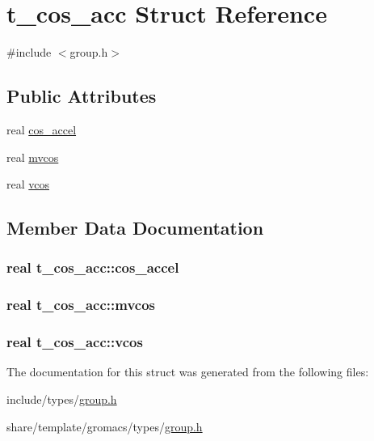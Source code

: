 \hypertarget{structt__cos__acc}{\section{t\-\_\-cos\-\_\-acc \-Struct \-Reference}
\label{structt__cos__acc}
}


{\ttfamily \#include $<$group.\-h$>$}

\subsection*{\-Public \-Attributes}
\begin{DoxyCompactItemize}
\item 
real \hyperlink{structt__cos__acc_aa9fc7e4b40d13e6993f7da90b6ddd2db}{cos\-\_\-accel}
\item 
real \hyperlink{structt__cos__acc_a46628a74f348199f4898c2e503c36602}{mvcos}
\item 
real \hyperlink{structt__cos__acc_a4e7dfb166a61e8dac5c9a698602eef5a}{vcos}
\end{DoxyCompactItemize}


\subsection{\-Member \-Data \-Documentation}
\hypertarget{structt__cos__acc_aa9fc7e4b40d13e6993f7da90b6ddd2db}{
\subsubsection[{cos\-\_\-accel}]{\setlength{\rightskip}{0pt plus 5cm}real {\bf t\-\_\-cos\-\_\-acc\-::cos\-\_\-accel}}}\label{structt__cos__acc_aa9fc7e4b40d13e6993f7da90b6ddd2db}
\hypertarget{structt__cos__acc_a46628a74f348199f4898c2e503c36602}{
\subsubsection[{mvcos}]{\setlength{\rightskip}{0pt plus 5cm}real {\bf t\-\_\-cos\-\_\-acc\-::mvcos}}}\label{structt__cos__acc_a46628a74f348199f4898c2e503c36602}
\hypertarget{structt__cos__acc_a4e7dfb166a61e8dac5c9a698602eef5a}{
\subsubsection[{vcos}]{\setlength{\rightskip}{0pt plus 5cm}real {\bf t\-\_\-cos\-\_\-acc\-::vcos}}}\label{structt__cos__acc_a4e7dfb166a61e8dac5c9a698602eef5a}


\-The documentation for this struct was generated from the following files\-:\begin{DoxyCompactItemize}
\item 
include/types/\hyperlink{include_2types_2group_8h}{group.\-h}\item 
share/template/gromacs/types/\hyperlink{share_2template_2gromacs_2types_2group_8h}{group.\-h}\end{DoxyCompactItemize}
